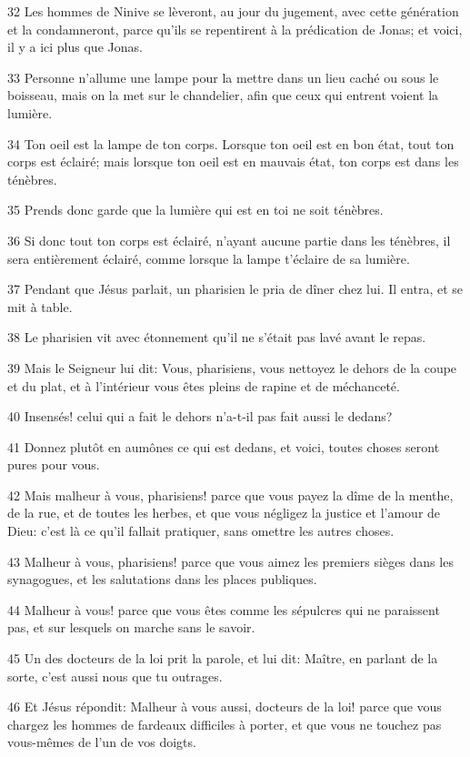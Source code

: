 \par 32 Les hommes de Ninive se lèveront, au jour du jugement, avec cette génération et la condamneront, parce qu'ils se repentirent à la prédication de Jonas; et voici, il y a ici plus que Jonas.
\par 33 Personne n'allume une lampe pour la mettre dans un lieu caché ou sous le boisseau, mais on la met sur le chandelier, afin que ceux qui entrent voient la lumière.
\par 34 Ton oeil est la lampe de ton corps. Lorsque ton oeil est en bon état, tout ton corps est éclairé; mais lorsque ton oeil est en mauvais état, ton corps est dans les ténèbres.
\par 35 Prends donc garde que la lumière qui est en toi ne soit ténèbres.
\par 36 Si donc tout ton corps est éclairé, n'ayant aucune partie dans les ténèbres, il sera entièrement éclairé, comme lorsque la lampe t'éclaire de sa lumière.
\par 37 Pendant que Jésus parlait, un pharisien le pria de dîner chez lui. Il entra, et se mit à table.
\par 38 Le pharisien vit avec étonnement qu'il ne s'était pas lavé avant le repas.
\par 39 Mais le Seigneur lui dit: Vous, pharisiens, vous nettoyez le dehors de la coupe et du plat, et à l'intérieur vous êtes pleins de rapine et de méchanceté.
\par 40 Insensés! celui qui a fait le dehors n'a-t-il pas fait aussi le dedans?
\par 41 Donnez plutôt en aumônes ce qui est dedans, et voici, toutes choses seront pures pour vous.
\par 42 Mais malheur à vous, pharisiens! parce que vous payez la dîme de la menthe, de la rue, et de toutes les herbes, et que vous négligez la justice et l'amour de Dieu: c'est là ce qu'il fallait pratiquer, sans omettre les autres choses.
\par 43 Malheur à vous, pharisiens! parce que vous aimez les premiers sièges dans les synagogues, et les salutations dans les places publiques.
\par 44 Malheur à vous! parce que vous êtes comme les sépulcres qui ne paraissent pas, et sur lesquels on marche sans le savoir.
\par 45 Un des docteurs de la loi prit la parole, et lui dit: Maître, en parlant de la sorte, c'est aussi nous que tu outrages.
\par 46 Et Jésus répondit: Malheur à vous aussi, docteurs de la loi! parce que vous chargez les hommes de fardeaux difficiles à porter, et que vous ne touchez pas vous-mêmes de l'un de vos doigts.
